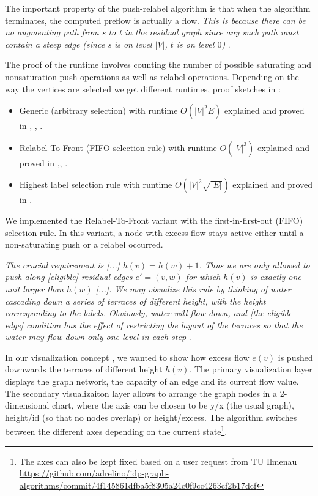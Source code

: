 The important property of the push-relabel algorithm is that when the algorithm terminates, the computed preflow is actually a flow. \textit{This is because there can be no augmenting path from s to t in the residual graph since any such path must contain a steep edge (since s is on level $|V|$, $t$ is on level $0$)} \cite{mehlhorn2000maximum}.

The proof of the runtime involves counting the number of possible saturating and nonsaturation push operations as well as relabel operations. Depending on the way the vertices are selected we get different runtimes, proof sketches in \cite{mehlhorn2000maximum,williamson2007network,matuschke2016network}:
\begin{itemize}
	\item Generic (arbitrary selection) with runtime $O(|V|^2E)$ explained and proved in \cite[sec. 7.6]{ahuja1993network}, \cite[sec. 26.4]{cormen2009introduction}, \cite[alg. 6.6.1]{jungnickel2013graphs}. 
	\item Relabel-To-Front (FIFO selection rule) with runtime $O(|V|^3)$ explained and proved in \cite[sec. 7.7]{ahuja1993network},\cite[sec. 26.5]{cormen2009introduction}, \cite[alg. 6.6.14]{jungnickel2013graphs}.
	\item Highest label selection rule with runtime $O(|V|^2\sqrt{|E|})$ explained and proved in \cite[sec. 7.8]{ahuja1993network} \cite[alg. 6.6.16]{jungnickel2013graphs}.
\end{itemize}

We implemented the Relabel-To-Front variant with the first-in-first-out (FIFO) selection rule. In this variant, a node with excess flow stays active either until a non-saturating push or a relabel occurred. 


\textit{The crucial requirement is [...] $h(v) = h(w) + 1$. Thus we are only allowed to push along [eligible] residual edges $e'=(v,w)$ for which $h(v)$ is exactly one unit larger than $h(w)$ [...]. We may visualize this rule by thinking of water cascading down a series of terraces of different height, with the height corresponding to the labels. Obviously, water will flow down, and [the eligible edge] condition has the effect of restricting the layout of the terraces so that the water may flow down only one level in each step} \cite[sec. 6.6]{jungnickel2013graphs}.

In our visualization concept , we wanted to show how excess flow $e(v)$ is pushed downwards the terraces of different height $h(v)$. The primary visualization layer displays the graph network, the capacity of an edge and its current flow value. The secondary visualizaiton layer allows to arrange the graph nodes in a 2-dimensional chart, where the axis can be chosen to be y/x (the usual graph), height/id (so that no nodes overlap) or height/excess. The algorithm switches between the different axes depending on the current state\footnote{The axes can also be kept fixed based on a user request from TU Ilmenau \url{https://github.com/adrelino/idp-graph-algorithms/commit/4f145861dfba5f8305a24c0f9cc4263cf2b17dcf}}.

